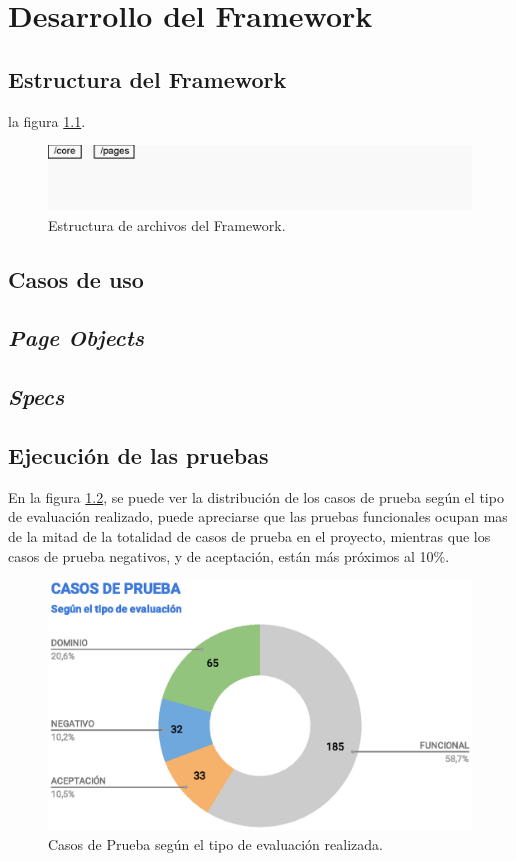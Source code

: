 \chapter{Desarrollo del Framework}

\section{Estructura del Framework}
la figura \ref{estructura}.

\begin{figure}
\centering
\includegraphics[width=1.0\textwidth]{graphics/diagram01.eps}
\caption{Estructura de archivos del Framework.}
\label{estructura}
\end{figure}

\section{Casos de uso}
\section{\emph{Page Objects}}
\section{\emph{Specs}}

\section{Ejecución de las pruebas}
En la figura \ref{tc-tests}, se puede ver la distribución de los casos de prueba
según el tipo de evaluación realizado, puede apreciarse que las pruebas
funcionales ocupan mas de la mitad de la totalidad de casos de prueba en el
proyecto, mientras que los casos de prueba negativos, y de aceptación, están más
próximos al 10\%.

\begin{figure}
\centering
\includegraphics[width=1.0\textwidth]{graphics/tc-tests.eps}
\caption{Casos de Prueba según el tipo de evaluación realizada.}
\label{tc-tests}
\end{figure}

